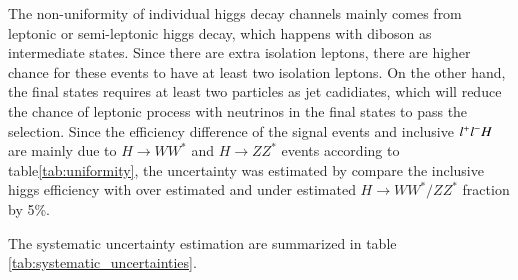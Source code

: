 The non-uniformity of individual higgs decay channels mainly comes from leptonic or 
semi-leptonic higgs decay, which happens with diboson as intermediate states. Since 
there are extra isolation leptons, there are higher chance for these events to have 
at least two isolation leptons. On the other hand, the final states requires at 
least two particles as jet cadidiates, which will reduce the chance of leptonic process with neutrinos in the final states to pass the selection. 
Since the efficiency difference of the signal events and inclusive $l^{+}l^{-}H$ are mainly due to $H\to WW^*$ and $H\to ZZ^*$ events according to table\ref{tab:uniformity}, the uncertainty was estimated by compare the inclusive higgs efficiency with over estimated and under estimated $H\to WW^*/ZZ^*$ fraction by 5\%.\par
The systematic uncertainty estimation are summarized in table \ref{tab:systematic_uncertainties}.\par
